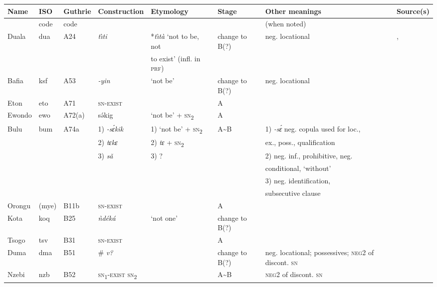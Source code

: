 \documentclass[output=paper,draft,draftmode,colorlinks,citecolor=brown]{langscibook}
\begin{document}
\begin{paperappendix}
\begin{sidewaystable}[p]
\begin{tabularx}{\textwidth}{llllllQQ}
\lsptoprule
{Name}	&{ISO}	&{Guthrie}	&{Construction}&{Etymology}		&{Stage}	&{Other meanings}&{Source(s)}\\
\midrule
				&{code}	&{code}	&				&										&		&{(when noted)}							&\\
{Duala}	&{dua}	&{A24}	&\textit{t{\`\i}ti} &*\textit{t{\`\i}t\`a} `not to be, not		&change to B(?)	&neg. locational						&\citet{Ittmann1939},\\
				&				&				&				&to exist' (infl. in \textsc{prf})				&		&									&\citet{Ittmann1976}\\
{Bafia}	&{ksf}		&{A53}	&\textit{-yin}		&`not be'								&change to B(?)	&neg. locational						&\citet{Guarisma1992}\\
{Eton}		&{eto}		&{A71}	&\textsc{sn-exist}&\textendash								&A		&									&\citet{Velde2008}\\
{Ewondo}	&{ewo}	&{A72(a)} 	&s{\'ə}kig		&`not be' + \textsc{sn}\textsubscript{2}			&A		&									&\citet{Essono1993}\\
{Bulu}		&{bum}	&{A74a}	&1) \textit{-s{\'ɛ}kik}&1) `not be' + \textsc{sn}\textsubscript{2}		&A{\textasciitilde}B&1) \textit{-s\'ɛ} neg. copula used for loc.,& \citet{Alexandre1966}\\
				&				&				&2) \textit{tɛkɛ}	&2) \textit{tɛ} + \textsc{sn}\textsubscript{2}		&		&ex., poss., qualification				&\\
				&				&				&3) \textit{sǎ}	&3) ?									&		&2) neg. inf., prohibitive, neg.			&\\									
				&				&				&				&										&		&conditional, `without'				&\\
				&				&				&				&										&		&3) neg. identification,				&\\
				&				&				&				&										&		&subsecutive clause					&\\
{Orongu} 	&{(mye)}	&{B11b}	&\textsc{sn-exist}&\textendash								&A 		& 									&\citet{Ambouroue2007}\\
{Kota}		&{koq}	&{B25}	&\textit{{\`n}d{é}k\'a}& `not one'						&change to B(?)	&  									&\citet{Piron1990}\\
{Tsogo}	&{tsv}		&{B31} 	&\textsc{sn-exist}	&\textendash								&A 		& 									&\citet{Marchal1979}\\
{Duma}	&{dma}	&{B51}	&\# \textit{v?}	&\textendash								&change to B(?)	&neg. locational; possessives; \textsc{neg}2 of discont. \textsc{sn}			&\citet{Adam1954}\\
{Nzebi}	&{nzb}	&{B52}	&\textsc{sn}\textsubscript{1}-\textsc{exist sn}\textsubscript{2}	&\textendash								& A{\textasciitilde}B		& 		\textsc{neg2} of discont. \textsc{sn}	 					&\citet{Marchal1987}\\

\end{tabularx}
\end{sidewaystable}
\end{paperappendix}
\end{document}
